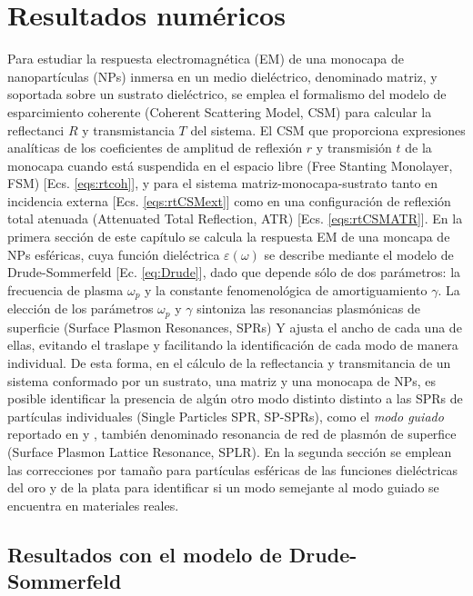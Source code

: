 \chapter{Resultados numéricos}

Para estudiar la respuesta electromagnética (EM) de una monocapa de nanopartículas (NPs) inmersa en un medio dieléctrico, denominado matriz, y soportada sobre un sustrato dieléctrico, se emplea el formalismo del modelo de esparcimiento coherente (Coherent Scattering Model, CSM) para calcular la reflectanci $R$ y transmistancia $T$ del sistema. El CSM que proporciona expresiones analíticas de los coeficientes de amplitud de reflexión $r$ y transmisión $t$ de la monocapa cuando está suspendida en el espacio libre (Free Stanting Monolayer, FSM) [Ecs. \eqref{eqs:rtcoh}], y para el sistema matriz-monocapa-sustrato tanto en incidencia externa [Ecs. \eqref{eqs:rtCSMext}] como en una configuración de reflexión total atenuada  (Attenuated Total Reflection, ATR) [Ecs. \eqref{eqs:rtCSMATR}]. En la primera sección de este capítulo se calcula la respuesta EM de una moncapa de NPs esféricas, cuya  función dieléctrica $\varepsilon(\omega)$ se describe mediante el modelo de Drude-Sommerfeld [Ec. \eqref{eq:Drude}], dado que depende sólo de dos parámetros: la frecuencia de plasma $\omega_p$ y la constante fenomenológica de amortiguamiento $\gamma$. La elección de los parámetros $\omega_p$ y $\gamma$ sintoniza las resonancias plasmónicas de superficie (Surface Plasmon Resonances, SPRs) Y ajusta el ancho de cada una de ellas, evitando el traslape y facilitando la identificación de cada modo de manera individual. De esta forma, en el cálculo de la reflectancia y transmitancia de un sistema conformado por un sustrato, una matriz y una monocapa de NPs, es posible identificar la presencia de algún otro modo  distinto distinto a las SPRs de partículas individuales (Single Particles SPR, SP-SPRs), como el \emph{modo guiado} reportado en \cite{kabashin2009plasmonic} y \cite{danilov2018ultra}, también denominado resonancia de red de plasmón de superfice (Surface Plasmon Lattice Resonance, SPLR). En la segunda sección se emplean las correcciones por tamaño para partículas esféricas de las funciones dieléctricas del oro y de la plata para identificar si un modo semejante al modo guiado se encuentra en materiales reales.

\section{Resultados con el modelo de Drude-Sommerfeld}

